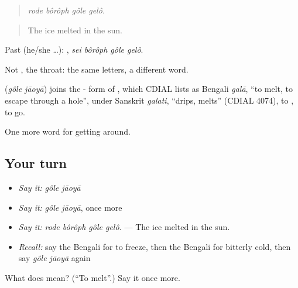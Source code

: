 \begin{quote}
   
\end{quote}

\begin{quote}
\emph{rode bôrôph gôle gelô.}
\end{quote}

\begin{quote}
The ice melted in the sun.
\end{quote}

Past (he/she …):    , \emph{sei bôrôph gôle gelô}.

Not , the throat: the same letters, a different word.

\begin{cousinweb}
\textbf{ } (\emph{gôle jāoyā}) joins the - form of , which CDIAL lists as Bengali \emph{galā}, \textquotedblleft{}to melt, to escape through a hole\textquotedblright{}, under Sanskrit \emph{galati}, \textquotedblleft{}drips, melts\textquotedblright{} (CDIAL 4074), to , to go.
\end{cousinweb}

\begin{grammarlens}[title={What you've built}]
One more word for getting around.
\end{grammarlens}

\subsection*{Your turn}
\begin{itemize}
\raggedright
  \item \emph{Say it:} \emph{gôle jāoyā}
  \item \emph{Say it:} \emph{gôle jāoyā}, once more
  \item \emph{Say it:} \emph{rode bôrôph gôle gelô.} — The ice melted in the sun.
  \item \emph{Recall:} say the Bengali for to freeze, then the Bengali for bitterly cold, then say \emph{gôle jāoyā} again
\end{itemize}

\begin{tcolorbox}[breakable,colback=teal!4,colframe=teal!35!black,title={Before you move on}]
What does   mean? (\textquotedblleft{}To melt\textquotedblright{}.) Say it once more.
\end{tcolorbox}
